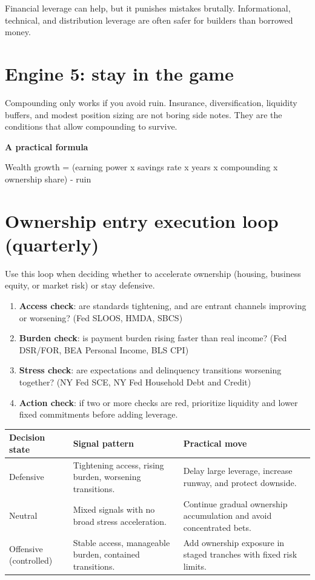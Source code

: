 \documentclass[11pt,openany]{book}
\begin{document}
Financial leverage can help, but it punishes mistakes brutally. Informational, technical, and distribution leverage are often safer for builders than borrowed money.

\section{Engine 5: stay in the game}

Compounding only works if you avoid ruin. Insurance, diversification, liquidity buffers, and modest position sizing are not boring side notes. They are the conditions that allow compounding to survive.

\begin{signalbox}
\textbf{A practical formula}\par
Wealth growth = (earning power x savings rate x years x compounding x ownership share) - ruin
\end{signalbox}

\section{Ownership entry execution loop (quarterly)}

Use this loop when deciding whether to accelerate ownership (housing, business equity, or market risk) or stay defensive.

\begin{enumerate}
  \item \textbf{Access check}: are standards tightening, and are entrant channels improving or worsening? (Fed SLOOS, HMDA, SBCS)
  \item \textbf{Burden check}: is payment burden rising faster than real income? (Fed DSR/FOR, BEA Personal Income, BLS CPI)
  \item \textbf{Stress check}: are expectations and delinquency transitions worsening together? (NY Fed SCE, NY Fed Household Debt and Credit)
  \item \textbf{Action check}: if two or more checks are red, prioritize liquidity and lower fixed commitments before adding leverage.
\end{enumerate}

\begin{center}
\small
\begin{tabularx}{\textwidth}{>{\raggedright\arraybackslash}p{}>{\raggedright\arraybackslash}p{}X}
\toprule
\textbf{Decision state} & \textbf{Signal pattern} & \textbf{Practical move} \\
\midrule
Defensive & Tightening access, rising burden, worsening transitions. & Delay large leverage, increase runway, and protect downside. \\
Neutral & Mixed signals with no broad stress acceleration. & Continue gradual ownership accumulation and avoid concentrated bets. \\
Offensive (controlled) & Stable access, manageable burden, contained transitions. & Add ownership exposure in staged tranches with fixed risk limits. \\
\bottomrule
\end{tabularx}
\normalsize
\end{center}
\end{document}
